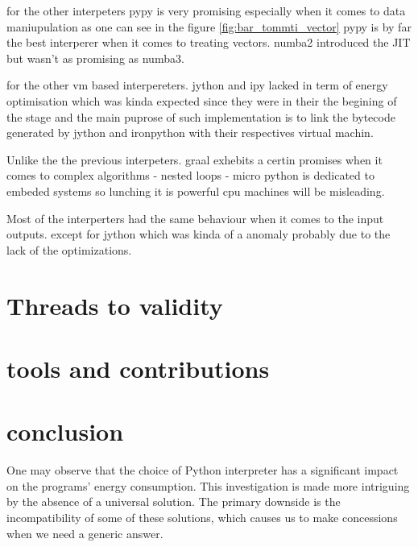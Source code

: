 for the other interpeters pypy is very promising especially when it comes to data maniupulation as one can see in the figure \ref{fig:bar_tommti_vector}
pypy is by far the best interperer when it comes to treating vectors.
numba2 introduced the JIT but wasn't as promising as numba3.

for the other vm based interpereters. jython and ipy lacked in term of energy optimisation which was kinda expected since they were in their the begining of the stage and the main puprose of such implementation is to link the bytecode generated by jython and ironpython with their respectives virtual machin.

Unlike the the previous interpeters. graal exhebits a certin promises when it comes to complex algorithms - nested loops -
micro python is dedicated to embeded systems so lunching it is powerful cpu machines will be misleading.

Most of the interperters had the same behaviour when it comes to the input outputs. except for jython which was kinda of a anomaly probably due to the lack of the optimizations.

\section{Threads to validity}
\section{tools and contributions}



\section{conclusion}
One may observe that the choice of Python interpreter has a significant impact on the programs' energy consumption.
This investigation is made more intriguing by the absence of a universal solution.
The primary downside is the incompatibility of some of these solutions, which causes us to make concessions when we need a generic answer. 


